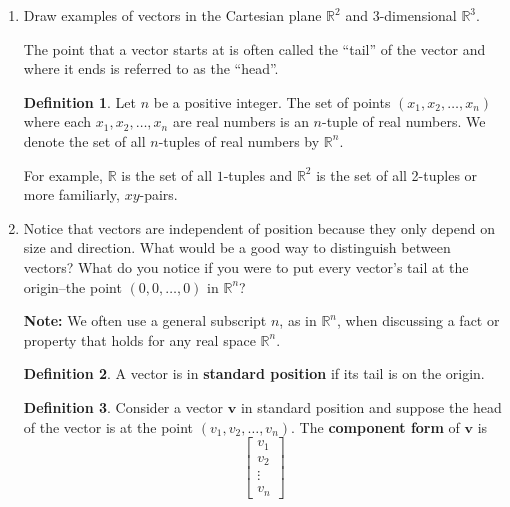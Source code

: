 \documentclass[12pt]{amsart}
\newcommand{\R}{\mathbb{R}}
\theoremstyle{definition}
\newtheorem*{definition}{Definition}
\begin{document}
\begin{enumerate}[itemsep=0.8em,leftmargin=0pt]

\item Draw examples of vectors in the Cartesian plane $\R^2$ and 3-dimensional $\R^3$.

\vspace{0.8em}
\noindent The point that a vector starts at is often called the ``tail'' of the vector and where it ends is referred to as the ``head''.

\begin{definition}
    Let $n$ be a positive integer. The set of points $(x_1,x_2,\ldots,x_n)$ where each $x_1,x_2,\ldots,x_n$ are real numbers is an $n$-tuple of real numbers. We denote the set of all $n$-tuples of real numbers by $\R^n$.
\end{definition}

\noindent For example, $\R$ is the set of all $1$-tuples and $\R^2$ is the set of all 2-tuples or more familiarly, $xy$-pairs.

\item Notice that vectors are independent of position because they only depend on size and direction. What would be a good way to distinguish between vectors? What do you notice if you were to put every vector's tail at the origin--the point $(0,0,\ldots,0)$ in $\R^n$?

\vspace{0.8em}
\noindent \textbf{Note:} We often use a general subscript $n$, as in $\R^n$, when discussing a fact or property that holds for any real space $\R^n$.

\begin{definition}
    A vector is in \textbf{standard position} if its tail is on the origin.
\end{definition}

\begin{definition}
    Consider a vector $\mathbf{v}$ in standard position and suppose the head of the vector is at the point $(v_1,v_2,\ldots,v_n)$. The \textbf{component form} of $\mathbf{v}$ is 
    \[
        \left[\begin{array}{c}
            v_1 \\
            v_2 \\
            \vdots \\
            v_n
        \end{array}\right]
    \]
\end{definition}


\end{enumerate}
\end{document}
